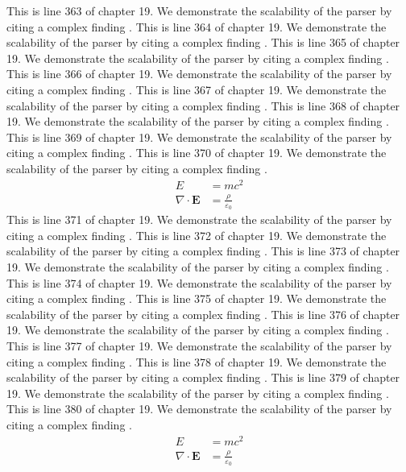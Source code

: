 This is line 363 of chapter 19. We demonstrate the scalability of the parser by citing a complex finding \cite{ref19_363}.
This is line 364 of chapter 19. We demonstrate the scalability of the parser by citing a complex finding \cite{ref19_364}.
This is line 365 of chapter 19. We demonstrate the scalability of the parser by citing a complex finding \cite{ref19_365}.
This is line 366 of chapter 19. We demonstrate the scalability of the parser by citing a complex finding \cite{ref19_366}.
This is line 367 of chapter 19. We demonstrate the scalability of the parser by citing a complex finding \cite{ref19_367}.
This is line 368 of chapter 19. We demonstrate the scalability of the parser by citing a complex finding \cite{ref19_368}.
This is line 369 of chapter 19. We demonstrate the scalability of the parser by citing a complex finding \cite{ref19_369}.
This is line 370 of chapter 19. We demonstrate the scalability of the parser by citing a complex finding \cite{ref19_370}.
\begin{align*}
  E &= mc^2 \\
  \nabla \cdot \mathbf{E} &= \frac{\rho}{\varepsilon_0}
\end{align*}
This is line 371 of chapter 19. We demonstrate the scalability of the parser by citing a complex finding \cite{ref19_371}.
This is line 372 of chapter 19. We demonstrate the scalability of the parser by citing a complex finding \cite{ref19_372}.
This is line 373 of chapter 19. We demonstrate the scalability of the parser by citing a complex finding \cite{ref19_373}.
This is line 374 of chapter 19. We demonstrate the scalability of the parser by citing a complex finding \cite{ref19_374}.
This is line 375 of chapter 19. We demonstrate the scalability of the parser by citing a complex finding \cite{ref19_375}.
This is line 376 of chapter 19. We demonstrate the scalability of the parser by citing a complex finding \cite{ref19_376}.
This is line 377 of chapter 19. We demonstrate the scalability of the parser by citing a complex finding \cite{ref19_377}.
This is line 378 of chapter 19. We demonstrate the scalability of the parser by citing a complex finding \cite{ref19_378}.
This is line 379 of chapter 19. We demonstrate the scalability of the parser by citing a complex finding \cite{ref19_379}.
This is line 380 of chapter 19. We demonstrate the scalability of the parser by citing a complex finding \cite{ref19_380}.
\begin{align*}
  E &= mc^2 \\
  \nabla \cdot \mathbf{E} &= \frac{\rho}{\varepsilon_0}
\end{align*}
